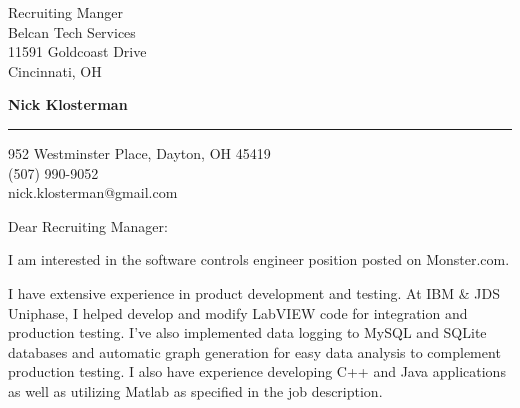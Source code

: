 \documentclass{letter} %
\newcommand{\person}{Recruiting Manager}
\newcommand{\position}{software controls engineer }%
\begin{document}
\signature{Nick Klosterman}           %
\longindentation=0pt                       %
\let\raggedleft\raggedright                %
 

 
\begin{letter}{Recruiting Manger \\
Belcan Tech Services \\
11591 Goldcoast Drive\\
Cincinnati, OH

}

  \begin{flushright}
 \hfill   \large\bf Nick Klosterman  \\
\end{flushright}
\begin{flushright}
    \medskip\hrule height 1pt
    \hfill 952 Westminster Place, Dayton, OH 45419 \\
    \hfill (507) 990-9052 \\
    \hfill nick.klosterman@gmail.com
  \end{flushright} 
\vfill %

 
\opening{Dear \person :} 

\noindent 
I am interested in the \position position posted on Monster.com. 

\noindent
I have extensive experience in product development and testing. 
At IBM \& JDS Uniphase, I helped develop and modify LabVIEW code for integration and production testing.
I've also implemented data logging to MySQL and SQLite databases and automatic graph generation for easy data analysis to complement production testing.
I also have experience developing C++ and Java applications as well as utilizing Matlab as specified in the job description.
 

\end{letter}
\end{document}
